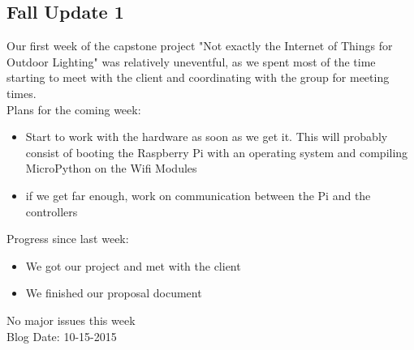 \subsection{Fall Update 1}
Our first week of the capstone project "Not exactly the Internet of Things for Outdoor Lighting" was relatively uneventful, as we spent most of the time starting to meet with the client and coordinating with the group for meeting times.\\
Plans for the coming week:
\begin{itemize}
\item Start to work with the hardware as soon as we get it. This will probably consist of booting the Raspberry Pi with an operating system and compiling MicroPython on the Wifi Modules
\item if we get far enough, work on communication between the Pi and the controllers
\end{itemize}
Progress since last week:
\begin{itemize}
\item We got our project and met with the client
\item We finished our proposal document
\end{itemize}
No major issues this week\\
Blog Date: 10-15-2015
